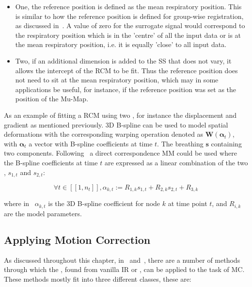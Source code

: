                 \begin{itemize}
                    \item One, the reference position is defined as the mean respiratory position. This is similar to how the reference position is defined for group-wise registration, as discussed in~. A value of zero for the surrogate signal would correspond to the respiratory position which is in the 'centre' of all the input data or is at the mean respiratory position, i.e. it is equally 'close' to all input data.
                    
                    \item Two, if an additional dimension is added to the \gls{SS} that does not vary, it allows the intercept of the \gls{RCM} to be fit. Thus the reference position does not need to sit at the mean respiratory position, which may in some applications be useful, for instance, if the reference position was set as the position of the \gls{Mu-Map}.
                \end{itemize}
                
                As an example of fitting a \gls{RCM} using two , for instance the displacement and gradient as mentioned previously. \gls{3D} B-spline can be used to model spatial deformations with the corresponding warping operation denoted as $\mathbf{W}(\mathbf{\alpha}_t)$, with $\mathbf{\alpha}_t$ a vector with B-spline coefficients at time $t$. The breathing  $\mathbf{s}$ containing two components. Following~ a direct correspondence \gls{MM} could be used where the B-spline coefficients at time $t$ are expressed as a linear combination of the two , $s_{1,t}$ and $s_{2,t}$:
            
                \begin{equation}\label{eq:respiratory_correspondence_model_motion_parameters}
                    \forall t \in [[1, n_t]], \alpha_{k, t} := R_{1, k} s_{1, t} + R_{2, k} s_{2, t} + R_{3, k}
                \end{equation}
                
                \noindent where in~ $\alpha_{k,t}$ is the \gls{3D} B-spline coefficient for node $k$ at time point $t$, and $R_{i,k}$ are the model parameters.
        
        \subsection{Applying Motion Correction} \label{sec:applying_motion_correction}
            As discussed throughout this chapter, in~ and~, there are a number of methods through which the , found from vanilla \gls{IR} or , can be applied to the task of \gls{MC}. These methods mostly fit into three different classes, these are:
            
